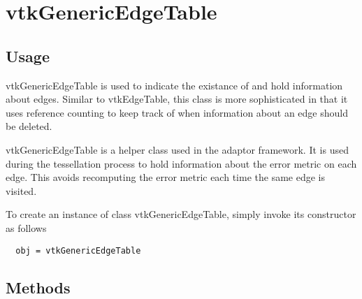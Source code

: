 \section{vtkGenericEdgeTable}

\subsection{Usage}

 vtkGenericEdgeTable is used to indicate the existance of and hold
 information about edges. Similar to vtkEdgeTable, this class is
 more sophisticated in that it uses reference counting to keep track
 of when information about an edge should be deleted.

 vtkGenericEdgeTable is a helper class used in the adaptor framework.  It
 is used during the tessellation process to hold information about the
 error metric on each edge. This avoids recomputing the error metric each
 time the same edge is visited.

To create an instance of class vtkGenericEdgeTable, simply
invoke its constructor as follows
\begin{verbatim}
  obj = vtkGenericEdgeTable
\end{verbatim}
\subsection{Methods}

